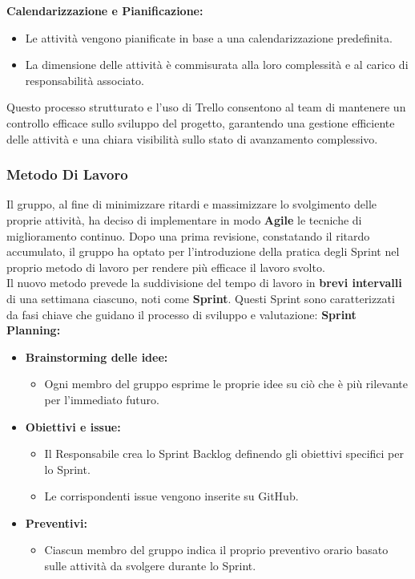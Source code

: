 \documentclass{article}
\begin{document}
\textbf{Calendarizzazione e Pianificazione:}
\begin{itemize}
    \item Le attività vengono pianificate in base a una calendarizzazione predefinita.
    \item La dimensione delle attività è commisurata alla loro complessità e al carico di responsabilità associato.
\end{itemize}
Questo processo strutturato e l'uso di Trello consentono al team di mantenere un controllo efficace sullo sviluppo del progetto, garantendo una gestione efficiente delle attività e una chiara visibilità sullo stato di avanzamento complessivo.
\subsubsection{Metodo Di Lavoro}

Il gruppo, al fine di minimizzare ritardi e massimizzare lo svolgimento delle proprie attività, ha deciso di implementare in modo \textbf{Agile} le tecniche di miglioramento continuo. Dopo una prima revisione, constatando il ritardo accumulato, il gruppo ha optato per l'introduzione della pratica degli Sprint nel proprio metodo di lavoro per rendere più efficace il lavoro svolto.\\
Il nuovo metodo prevede la suddivisione del tempo di lavoro in \textbf{brevi intervalli} di una settimana ciascuno, noti come \textbf{Sprint}. Questi Sprint sono caratterizzati da fasi chiave che guidano il processo di sviluppo e valutazione:
\textbf{Sprint Planning:}
\begin{itemize}
    \item \textbf{Brainstorming delle idee:}
    \begin{itemize}
        \item Ogni membro del gruppo esprime le proprie idee su ciò che è più rilevante per l'immediato futuro.
    \end{itemize}
    \item \textbf{Obiettivi e issue:}
    \begin{itemize}
        \item Il Responsabile crea lo Sprint Backlog definendo gli obiettivi specifici per lo Sprint.
        \item Le corrispondenti issue vengono inserite su GitHub.
    \end{itemize}
    \item \textbf{Preventivi:}
    \begin{itemize}
        \item Ciascun membro del gruppo indica il proprio preventivo orario basato sulle attività da svolgere durante lo Sprint.
    \end{itemize}
\end{itemize}
\end{document}
